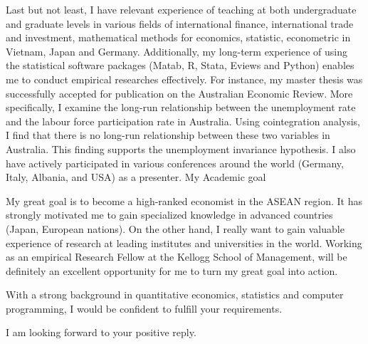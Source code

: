 \documentclass[11pt, a4paper]{awesome-cv}
\begin{document}
\begin{cvletter}
Last but not least, I have relevant experience of teaching at both undergraduate and graduate levels in various fields of international finance, international trade and investment, mathematical methods for economics, statistic, econometric in Vietnam, Japan and Germany. Additionally, my long-term experience of using the statistical software packages (Matab, R, Stata, Eviews and Python) enables me to conduct empirical researches effectively. For instance, my master thesis was successfully accepted for publication on the Australian Economic Review. More specifically, I examine the long-run relationship between the unemployment rate and the labour force participation rate in Australia. Using cointegration analysis, I find that there is no long-run relationship between these two variables in Australia. This finding supports the unemployment invariance hypothesis. I also have actively participated in various conferences around the world (Germany, Italy, Albania, and USA) as a presenter.
My Academic goal




My great goal is to become a high-ranked economist in the ASEAN region. It has strongly motivated me to gain specialized knowledge in advanced countries (Japan, European nations). On the other hand, I really want to gain valuable experience of research at leading institutes and universities in the world. Working as an empirical Research Fellow at the Kellogg School of Management, will be definitely an excellent opportunity for me to turn my great goal into action. 

With a strong background in quantitative economics, statistics and computer programming, I would be confident to fulfill your requirements.

I am looking forward to your positive reply.


\end{cvletter}

\makeletterclosing
\end{document}
